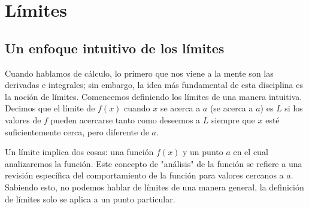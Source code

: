 \documentclass{report}
\begin{document}
    \tableofcontents

    \pagebreak
    \chapter{Límites}

    \section{Un enfoque intuitivo de los límites}
    Cuando hablamos de cálculo, lo primero que nos viene a la mente son las derivadas e integrales; sin embargo, la idea más fundamental de esta disciplina es la noción de límites. Comencemos definiendo los límites de una manera intuitiva. Decimos que el límite de $f(x)$ cuando $x$ se acerca a $a$ (se acerca a $a$) es $L$ si los valores de $f$ pueden acercarse tanto como deseemos a $L$ siempre que $x$ esté suficientemente cerca, pero diferente de $a$.

    Un límite implica dos cosas: una función $f(x)$ y un punto $a$ en el cual analizaremos la función. Este concepto de "análisis" de la función se refiere a una revisión específica del comportamiento de la función para valores cercanos a $a$. Sabiendo esto, no podemos hablar de límites de una manera general, la definición de límites solo se aplica a un punto particular.
\end{document}

